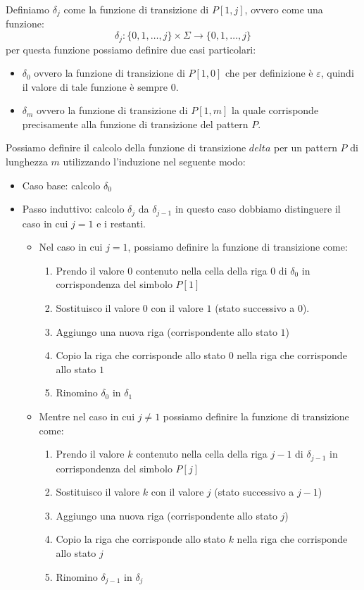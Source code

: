 Definiamo $\delta_j$ come la funzione di transizione di $P[1, j]$, ovvero come una funzione:
\begin{equation}
    \delta_j: \{0, 1, \dots, j\} \times \Sigma \to \{0, 1, \dots, j\}
\end{equation}
per questa funzione possiamo definire due casi particolari:
\begin{itemize}
    \item $\delta_0$ ovvero la funzione di transizione di $P[1, 0]$ che per definizione è $\varepsilon$, quindi il valore di tale funzione è sempre $0$.
    \item $\delta_m$ ovvero la funzione di transizione di $P[1, m]$ la quale corrisponde precisamente alla funzione di transizione del pattern $P$.
\end{itemize}
Possiamo definire il calcolo della funzione di transizione $delta$ per un pattern $P$ di lunghezza $m$ utilizzando l'induzione nel seguente modo:
\begin{itemize}
    \item Caso base: calcolo $\delta_0$
    \item Passo induttivo: calcolo $\delta_j$ da $\delta_{j - 1}$ in questo caso dobbiamo distinguere il caso in cui $j = 1$ e i restanti.
    \begin{itemize}
        \item Nel caso in cui $j = 1$, possiamo definire la funzione di transizione come:
        \begin{enumerate}
            \item Prendo il valore $0$ contenuto nella cella della riga $0$ di $\delta_0$ in corrispondenza del simbolo $P[1]$
            \item Sostituisco il valore $0$ con il valore $1$ (stato successivo a $0$).
            \item Aggiungo una nuova riga (corrispondente allo stato $1$)
            \item Copio la riga che corrisponde allo stato 0 nella riga che corrisponde allo stato $1$
            \item Rinomino $\delta_0$ in $\delta_1$
        \end{enumerate}
        \item Mentre nel caso in cui $j \neq 1$ possiamo definire la funzione di transizione come:
        \begin{enumerate}
            \item Prendo il valore $k$ contenuto nella cella della riga $j-1$ di $\delta_{j-1}$ in corrispondenza del simbolo $P[j]$
            \item Sostituisco il valore $k$ con il valore $j$ (stato successivo a $j - 1$)
            \item Aggiungo una nuova riga (corrispondente allo stato $j$)
            \item Copio la riga che corrisponde allo stato $k$ nella riga che corrisponde allo stato $j$
            \item Rinomino $\delta_{j-1}$ in $\delta_j$
        \end{enumerate}
    \end{itemize}
\end{itemize}
